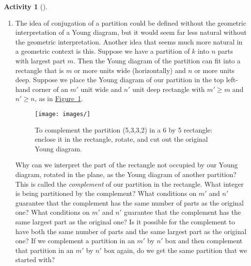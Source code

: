 \documentclass[10pt,]{book}
\theoremstyle{plain}
\theoremstyle{definition}
\newtheorem{activity}[project]{Activity}
\numberwithin{equation}{chapter}
\begin{document}
\begin{activity}[]
\begin{enumerate}[label=(\alph*)]
~\par
\item The idea of conjugation of a partition could be defined without the geometric interpretation of a Young diagram, but it would seem far less natural without the geometric interpretation. Another idea that seems much more natural in a geometric context is this. Suppose we have a partition of \(k\) into \(n\) parts with largest part \(m\). Then the Young diagram of the partition can fit into a rectangle that is \(m\) or more units wide (horizontally) and \(n\) or more units deep. Suppose we place the Young diagram of our partition in the top left-hand corner of an \(m'\) unit wide and \(n'\) unit deep rectangle with \(m'\ge m\) and \(n' \ge n\), as in \hyperref[complementpartition]{Figure~\ref{complementpartition}}.%
\begin{figure}
\centering
\texttt{[image: images/]}
\caption{To complement the partition (5,3,3,2) in a 6 by 5 rectangle: enclose it in the rectangle, rotate, and cut out the original Young diagram.\label{complementpartition}}
\end{figure}
Why can we interpret the part of the rectangle not occupied by our Young diagram, rotated in the plane, as the Young diagram of another partition? This is called the \emph{complement} of our partition in the rectangle. What integer is being partitioned by the complement? What conditions on \(m'\) and \(n'\) guarantee that the complement has the same number of parts as the original one? What conditions on \(m'\) and \(n'\) guarantee that the complement has the same largest part as the original one? Is it possible for the complement to have both the same number of parts and the same largest part as the original one? If we complement a partition in an \(m'\) by \(n'\) box and then complement that partition in an \(m'\) by \(n'\) box again, do we get the same partition that we started with?%
\par\medskip\noindent%

\end{enumerate}
\end{activity}
\end{document}
